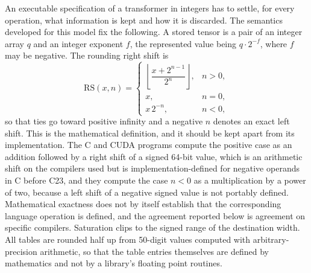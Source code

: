 \documentclass[11pt]{article}
\begin{document}
An executable specification of a transformer in integers has to settle, for every operation, what information is kept and how it is discarded. The semantics developed for this model fix the following. A stored tensor is a pair of an integer array $q$ and an integer exponent $f$, the represented value being $q\cdot 2^{-f}$, where $f$ may be negative. The rounding right shift is
\[
\mathrm{RS}(x,n)=
\begin{cases}
\left\lfloor \dfrac{x+2^{n-1}}{2^{n}}\right\rfloor, & n>0,\\[1ex]
x, & n=0,\\
x\,2^{-n}, & n<0,
\end{cases}
\]
so that ties go toward positive infinity and a negative $n$ denotes an exact left shift. This is the mathematical definition, and it should be kept apart from its implementation. The C and CUDA programs compute the positive case as an addition followed by a right shift of a signed 64-bit value, which is an arithmetic shift on the compilers used but is implementation-defined for negative operands in C before C23, and they compute the case $n<0$ as a multiplication by a power of two, because a left shift of a negative signed value is not portably defined. Mathematical exactness does not by itself establish that the corresponding language operation is defined, and the agreement reported below is agreement on specific compilers. Saturation clips to the signed range of the destination width. All tables are rounded half up from 50-digit values computed with arbitrary-precision arithmetic, so that the table entries themselves are defined by mathematics and not by a library's floating point routines.
\end{document}
